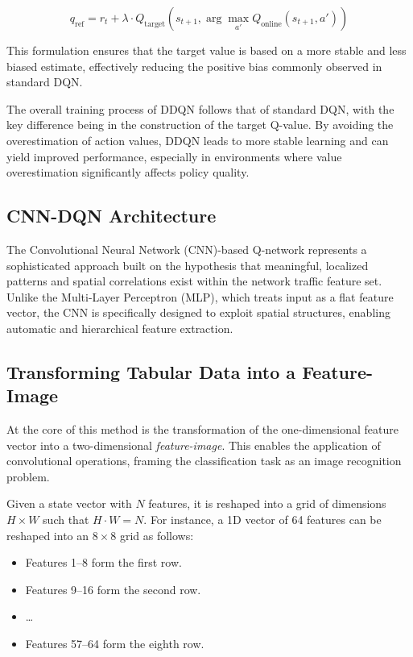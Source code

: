 \documentclass[12pt]{report}
\begin{document}
\[
q_{\text{ref}} = r_t + \lambda \cdot Q_{\text{target}}(s_{t+1}, \arg\max_{a'} Q_{\text{online}}(s_{t+1}, a'))
\]

This formulation ensures that the target value is based on a more stable and less biased estimate, effectively reducing the positive bias commonly observed in standard DQN.

The overall training process of DDQN follows that of standard DQN, with the key difference being in the construction of the target Q-value. By avoiding the overestimation of action values, DDQN leads to more stable learning and can yield improved performance, especially in environments where value overestimation significantly affects policy quality.

\subsection{CNN-DQN Architecture}

The Convolutional Neural Network (CNN)-based Q-network represents a sophisticated approach built on the hypothesis that meaningful, localized patterns and spatial correlations exist within the network traffic feature set. Unlike the Multi-Layer Perceptron (MLP), which treats input as a flat feature vector, the CNN is specifically designed to exploit spatial structures, enabling automatic and hierarchical feature extraction.

\subsection{Transforming Tabular Data into a Feature-Image}

At the core of this method is the transformation of the one-dimensional feature vector into a two-dimensional \textit{feature-image}. This enables the application of convolutional operations, framing the classification task as an image recognition problem.

Given a state vector with $N$ features, it is reshaped into a grid of dimensions $H \times W$ such that $H \cdot W = N$. For instance, a 1D vector of 64 features can be reshaped into an $8 \times 8$ grid as follows:

\begin{itemize}
    \item Features 1--8 form the first row.
    \item Features 9--16 form the second row.
    \item \dots
    \item Features 57--64 form the eighth row.
\end{itemize}
\end{document}
